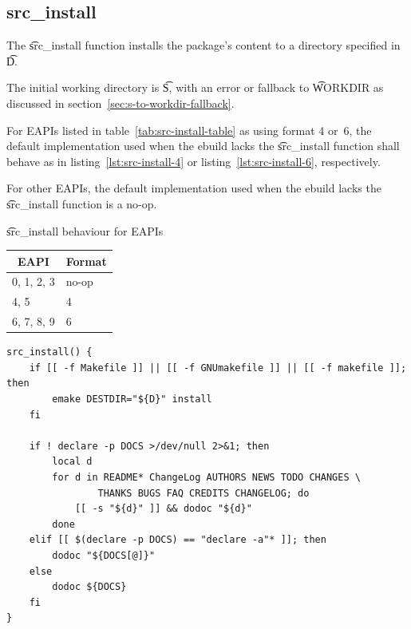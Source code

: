 \subsection{src_install}

 The \t{src_install} function installs the package's content to a
directory specified in \t{D}.

The initial working directory is \t{S}, with an error or fallback to \t{WORKDIR} as discussed in
section~\ref{sec:s-to-workdir-fallback}.

For EAPIs listed in table~\ref{tab:src-install-table} as using format 4 or~6, the default
implementation used when the ebuild lacks the \t{src_install} function shall behave as in
listing~\ref{lst:src-install-4} or listing~\ref{lst:src-install-6}, respectively.

For other EAPIs, the default implementation used when the ebuild lacks the \t{src_install} function
is a no-op.

\begin{centertable}{\t{src_install} behaviour for EAPIs}
    \label{tab:src-install-table}
    \begin{tabular}{ll}
      \toprule
      \multicolumn{1}{c}{\textbf{EAPI}} &
      \multicolumn{1}{c}{\textbf{Format}} \\
      \midrule
      0, 1, 2, 3        & no-op \\
      4, 5              & 4     \\
      6, 7, 8, 9        & 6     \\
      \bottomrule
    \end{tabular}
\end{centertable}

\begin{listing}[H]
\caption{\t{src_install}, format~4} \label{lst:src-install-4}
\begin{verbatim}
src_install() {
    if [[ -f Makefile ]] || [[ -f GNUmakefile ]] || [[ -f makefile ]]; then
        emake DESTDIR="${D}" install
    fi

    if ! declare -p DOCS >/dev/null 2>&1; then
        local d
        for d in README* ChangeLog AUTHORS NEWS TODO CHANGES \
                THANKS BUGS FAQ CREDITS CHANGELOG; do
            [[ -s "${d}" ]] && dodoc "${d}"
        done
    elif [[ $(declare -p DOCS) == "declare -a"* ]]; then
        dodoc "${DOCS[@]}"
    else
        dodoc ${DOCS}
    fi
}
\end{verbatim}
\end{listing}

